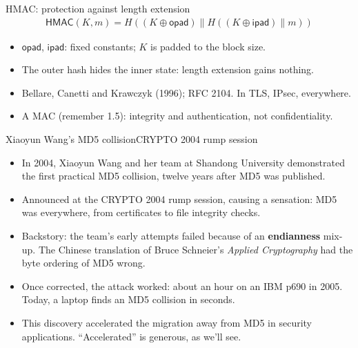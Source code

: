 \ifdefined\PRESENTATION\else\PassOptionsToClass{handout}{beamer}\fi\documentclass[aspectratio=169, lualatex]{beamer}
\begin{document}
\begin{frame}{HMAC: protection against length extension}
	\begin{align*}
		\textsf{HMAC}(K, m) = H((K \oplus \mathsf{opad}) \| H((K \oplus \mathsf{ipad}) \| m))
	\end{align*}
	\begin{itemize}
		\item $\mathsf{opad}$, $\mathsf{ipad}$: fixed constants; $K$ is padded to the block size.
		\item The outer hash hides the inner state: length extension gains nothing.
		\item Bellare, Canetti and Krawczyk (1996); RFC 2104. In TLS, IPsec, everywhere.
		\item A MAC (remember 1.5): integrity and authentication, not confidentiality.
	\end{itemize}
\end{frame}

\begin{frame}{Xiaoyun Wang's MD5 collision}{CRYPTO 2004 rump session}
	\begin{itemize}
		\item In 2004, Xiaoyun Wang and her team at Shandong University demonstrated the first practical MD5 collision, twelve years after MD5 was published.
		\item Announced at the CRYPTO 2004 rump session, causing a sensation: MD5 was everywhere, from certificates to file integrity checks.
		\item Backstory: the team's early attempts failed because of an \textbf{endianness} mix-up. The Chinese translation of Bruce Schneier's \emph{Applied Cryptography} had the byte ordering of MD5 wrong.
		\item Once corrected, the attack worked: about an hour on an IBM p690 in 2005. Today, a laptop finds an MD5 collision in seconds.
		\item This discovery accelerated the migration away from MD5 in security applications. ``Accelerated'' is generous, as we'll see.
	\end{itemize}
\end{frame}
\end{document}
